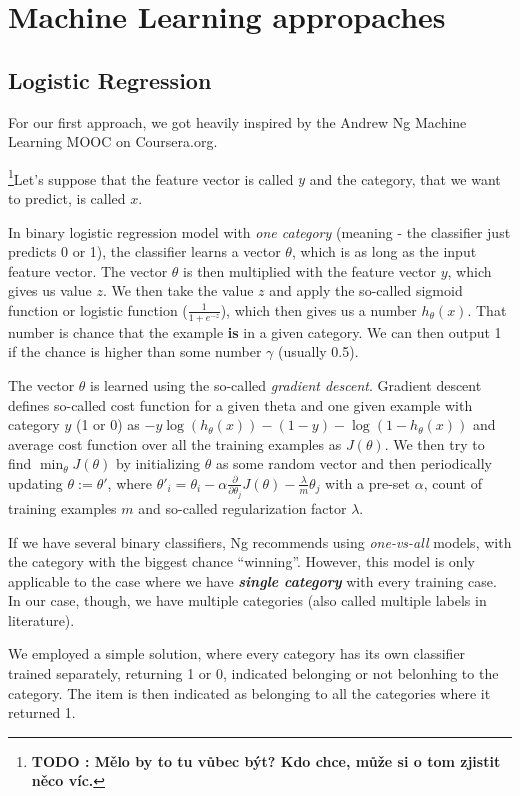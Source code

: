 \documentclass[letterpaper]{article}
\newcommand{\todofn}[1] {
 \footnote{\textbf{TODO : #1}}}
\begin{document}
\section{Machine Learning appropaches}
\subsection{Logistic Regression}
For our first approach, we got heavily inspired by the Andrew Ng Machine Learning MOOC  on Coursera.org.

\todofn{Mělo by to tu vůbec být? Kdo chce, může si o tom zjistit něco víc.}Let's suppose that the feature vector is called $y$ and the category, that we want to predict, is called $x$.

In binary logistic regression model with \emph{one category} (meaning - the classifier just predicts 0 or 1), the classifier learns a vector $\theta$, which is as long as the input feature vector. The vector $\theta$ is then multiplied with the feature vector $y$, which gives us value $z$. We then take the value $z$ and apply the so-called sigmoid function or logistic function ($\frac{1}{1+e^{-z}}$), which then gives us a number $h_\theta(x)$. That number is chance that the example \textbf{is} in a given category. We can then output 1 if the chance is higher than some number $\gamma$ (usually 0.5).

The vector $\theta$ is learned using the so-called \emph{gradient descent}. Gradient descent defines so-called cost function for a given theta and one given example with category $y$ (1 or 0) as $-y \log(h_\theta(x))-(1-y)-\log(1-h_\theta(x))$ and average cost function over all the training examples as $J(\theta)$. We then try to find $\min_\theta J(\theta)$ by initializing $\theta$ as some random vector and then periodically updating $\theta:=\theta'$, where $\theta'_i=\theta_i-\alpha\frac{\partial}{\partial \theta_j}J(\theta)-\frac{\lambda}{m}\theta_j$ with a pre-set $\alpha$, count of training examples $m$ and so-called regularization factor $\lambda$.

If we have several binary classifiers, Ng recommends using \emph{one-vs-all} models, with the category with the biggest chance ``winning''. However, this model is only applicable to the case where we have \textbf{\emph{single category}} with every training case. 
In our case, though, we have multiple categories (also called multiple labels in literature). 

We employed a simple solution, where every category has its own classifier trained separately, returning 1 or 0, indicated 
belonging or not belonhing to the category. The item is then indicated as belonging to all the categories where it returned 1.
\end{document}
